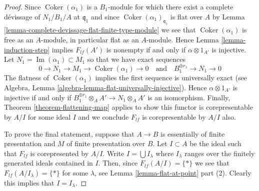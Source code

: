 \documentclass[10pt,a4paper]{amsart}
\theoremstyle{plain}
\theoremstyle{definition}
\theoremstyle{remark}
\numberwithin{equation}{subsection}
\def\Im{\mathop{\mathrm{Im}}}
\def\Coker{\mathop{\mathrm{Coker}}}
\begin{document}
\begin{proof}
\medskip\noindent
Since $\Coker(\alpha_1)$ is a $B_1$-module for which
there exist a complete d\'evissage of $N_1/B_1/A$ at $\mathfrak q_1$
and since $\Coker(\alpha_1)_{\mathfrak q_1}$ is
flat over $A$ by
Lemma \ref{lemma-complete-devissage-flat-finite-type-module}
we see that $\Coker(\alpha_1)$ is free as an $A$-module, in particular
flat as an $A$-module. Hence
Lemma \ref{lemma-induction-step}
implies $F_{lf}(A')$ is nonempty if and only if $\alpha \otimes 1_{A'}$
is injective. Let $N_1 = \Im(\alpha_1) \subset M_1$ so that
we have exact sequences
$$
0 \to N_1 \to M_1 \to \Coker(\alpha_1) \to 0
\quad\text{and}\quad
B_1^{\oplus r_1} \to N_1 \to 0
$$
The flatness of $\Coker(\alpha_1)$ implies the first sequence
is universally exact (see
Algebra, Lemma \ref{algebra-lemma-flat-universally-injective}).
Hence $\alpha \otimes 1_{A'}$ is injective if and only if
$B_1^{\oplus r_1} \otimes_A A' \to N_1 \otimes_A A'$
is an isomorphism. Finally,
Theorem \ref{theorem-flattening-map}
applies to show this functor is corepresentable by $A/I$ for some ideal $I$
and we conclude $F_{lf}$ is corepresentable by $A/I$ also.

\medskip\noindent
To prove the final statement, suppose that $A \to B$ is essentially of finite
presentation and $M$ of finite presentation over $B$. Let $I \subset A$
be the ideal such that $F_{lf}$ is corepresented by $A/I$.
Write $I = \bigcup I_\lambda$ where $I_\lambda$ ranges over the finitely
generated ideals contained in $I$. Then, since $F_{lf}(A/I) = \{*\}$
we see that $F_{lf}(A/I_\lambda) = \{*\}$ for some $\lambda$, see
Lemma \ref{lemma-flat-at-point} part (2).
Clearly this implies that $I = I_\lambda$.
\end{proof}
\end{document}
